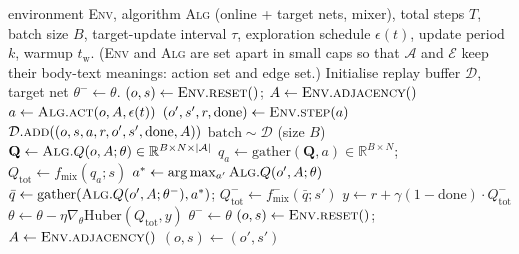 \documentclass[10pt]{article}
\newcommand{\algoname}[1]{\textsc{#1}}
\newcommand{\iql}{\algoname{IQL}}
\newcommand{\Aagent}{\mathcal{A}}
\begin{document}
\begin{algorithm}[!ht]
\caption{Shared training loop (CTDE, off-policy, Double-DQN). For \iql,
the team-loss line is replaced by a per-agent Huber sum (see
Section~\ref{sec:algos}).}
\label{alg:train}
\begin{algorithmic}[1]
\Require environment \textsc{Env}, algorithm \textsc{Alg} (online + target
  nets, mixer), total steps $T$, batch size $B$, target-update interval
  $\tau$, exploration schedule $\epsilon(t)$, update period $k$, warmup
  $t_{\text{w}}$. (\textsc{Env} and \textsc{Alg} are set apart in small
  caps so that $\mathcal{A}$ and $\mathcal{E}$ keep their body-text
  meanings: action set and edge set.)
\State Initialise replay buffer $\mathcal{D}$, target net $\theta^- \leftarrow \theta$.
\State $(o, s) \leftarrow \textsc{Env}.\textsc{reset}()$;\; $A \leftarrow \textsc{Env}.\textsc{adjacency}()$
  \State $a \leftarrow \textsc{Alg}.\textsc{act}(o, A, \epsilon(t))$
  \State $(o', s', r, \text{done}) \leftarrow \textsc{Env}.\textsc{step}(a)$
  \State $\mathcal{D}.\textsc{add}((o, s, a, r, o', s', \text{done}, A))$
    \State $\text{batch} \sim \mathcal{D}$ \quad (size $B$)
    \State $\mathbf{Q} \leftarrow \textsc{Alg}.Q(o, A; \theta) \in \mathbb{R}^{B \times N \times |\Aagent|}$
    \State $q_a \leftarrow \mathrm{gather}(\mathbf{Q}, a) \in \mathbb{R}^{B \times N}$;\;
           $Q_{\text{tot}} \leftarrow f_{\text{mix}}(q_a; s)$
    \State $a^* \leftarrow \arg\max_{a'} \textsc{Alg}.Q(o', A; \theta)$
    \State $\bar q \leftarrow \mathrm{gather}(\textsc{Alg}.Q(o', A; \theta^-), a^*)$;\;
           $Q^{-}_{\text{tot}} \leftarrow f_{\text{mix}}^{-}(\bar q; s')$
    \State $y \leftarrow r + \gamma (1{-}\text{done}) \cdot Q^{-}_{\text{tot}}$
    \State $\theta \leftarrow \theta - \eta \nabla_\theta \mathrm{Huber}(Q_{\text{tot}}, y)$
     $\theta^- \leftarrow \theta$ \EndIf
  \EndIf
   $(o, s) \leftarrow \textsc{Env}.\textsc{reset}()$;\; $A \leftarrow \textsc{Env}.\textsc{adjacency}()$
  \Else \;$(o, s) \leftarrow (o', s')$
  \EndIf
\EndFor
\end{algorithmic}
\end{algorithm}

\end{document}
